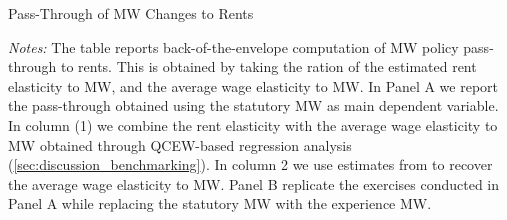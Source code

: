 \begin{table}[!h] 
	\centering
	\caption{Pass-Through of MW Changes to Rents}
	\label{tab:passthrough}  
	
	\begin{minipage}{0.95\textwidth} \footnotesize
		\vspace{2mm}
		\textit{Notes:} The table reports back-of-the-envelope computation of MW 
		policy pass-through to rents. This is obtained by taking the ration of the 
		estimated rent elasticity to MW, and the average wage elasticity to MW. 
		In Panel A we report the pass-through obtained using the statutory MW as 
		main dependent variable. In column (1) we combine the rent elasticity with 
		the average wage elasticity to MW obtained through QCEW-based regression
		analysis (\autoref{sec:discussion_benchmarking}). In column 2 we use estimates
		from \textcite{CegnizEtAl2019} to recover the average wage elasticity to MW. 
		Panel B replicate the exercises conducted in Panel A while replacing the statutory
		MW with the experience MW. 
	\end{minipage}
\end{table}

